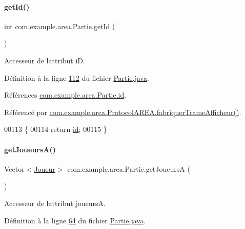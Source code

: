 \paragraph{\texorpdfstring{get\+Id()}{getId()}}
{\footnotesize\ttfamily int com.\+example.\+area.\+Partie.\+get\+Id (\begin{DoxyParamCaption}{ }\end{DoxyParamCaption})}



Accesseur de l\textquotesingle{}attribut iD. 



Définition à la ligne \hyperlink{_partie_8java_source_l00112}{112} du fichier \hyperlink{_partie_8java_source}{Partie.\+java}.



Références \hyperlink{_partie_8java_source_l00043}{com.\+example.\+area.\+Partie.\+id}.



Référencé par \hyperlink{_protocol_a_r_e_a_8java_source_l00048}{com.\+example.\+area.\+Protocol\+A\+R\+E\+A.\+fabriquer\+Trame\+Afficheur()}.


\begin{DoxyCode}
00113     \{
00114         \textcolor{keywordflow}{return} \hyperlink{classcom_1_1example_1_1area_1_1_partie_a06ef6dd2585a669a8230ed1217cd98f4}{id};
00115     \}
\end{DoxyCode}
\mbox{\label{classcom_1_1example_1_1area_1_1_partie_a0f944de317206d9b99f9ffc7146a43ef}} 
\paragraph{\texorpdfstring{get\+Joueurs\+A()}{getJoueursA()}}
{\footnotesize\ttfamily Vector$<$\hyperlink{classcom_1_1example_1_1area_1_1_joueur}{Joueur}$>$ com.\+example.\+area.\+Partie.\+get\+JoueursA (\begin{DoxyParamCaption}{ }\end{DoxyParamCaption})}



Accesseur de l\textquotesingle{}attribut joueursA. 



Définition à la ligne \hyperlink{_partie_8java_source_l00064}{64} du fichier \hyperlink{_partie_8java_source}{Partie.\+java}.



